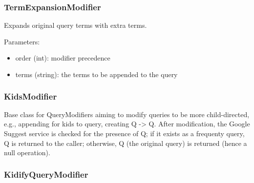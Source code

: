 \documentclass[letterpaper,10pt,english]{sphinxmanual}
\begin{document}
\subsubsection{TermExpansionModifier}
\label{api2.0:termexpansionmodifier}

\begin{fulllineitems}
\label{api2.0:puppy.query.modifier.TermExpansionModifier}
Expands original query terms with extra terms.

Parameters:
\begin{itemize}
\item {} 
order (int): modifier precedence

\item {} 
terms (string): the terms to be appended to the query

\end{itemize}

\end{fulllineitems}



\subsubsection{KidsModifier}
\label{api2.0:kidsmodifier}

\begin{fulllineitems}
\label{api2.0:puppy.query.modifier.KidsModifier}
Base class for QueryModifiers aiming to modify queries to be more
child-directed, e.g., appending for kids to query, creating Q -\textgreater{} Q.
After modification, the Google Suggest service is checked for the
presence of Q; if it exists as a frequenty query, Q is returned to
the caller; otherwise, Q (the original query) is returned (hence a null
operation).

\end{fulllineitems}



\subsubsection{KidifyQueryModifier}
\label{api2.0:kidifyquerymodifier}
\end{document}
